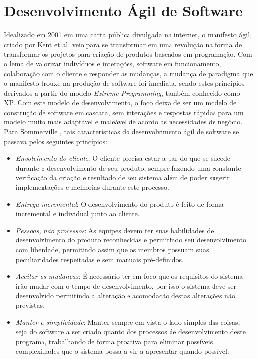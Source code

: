 \section{Desenvolvimento Ágil de Software}

Idealizado em 2001 em uma carta pública divulgada na internet, o manifesto ágil, criado por Kent et al. \cite{agilemanifesto} veio para se transformar em uma revolução na forma de transformar os projetos para criação de produtos baseados em programação. Com o lema de valorizar indivíduos e interações, software em funcionamento, colaboração com o cliente e responder as mudanças, a mudança de paradigma que o manifesto trouxe na produção de software foi imediata, sendo estes princípios derivados a partir do modelo \textit{Extreme Programming}, também conhecido como \acrshort{XP}. Com este modelo de desenvolvimento, o foco deixa de ser um modelo de construção de software em cascata, sem interações e respostas rápidas para um modelo muito mais adaptável e maleável de acordo as necessidades de negócio. Para Sommerville \cite{Sommerville07}, tais características do desenvolvimento ágil de software se passava pelos seguintes princípios:

\begin{itemize}
    \item \textit{Envolvimento do cliente}: O cliente precisa estar a par do que se sucede durante o desenvolvimento de seu produto, sempre fazendo uma constante verificação da criação e resultado de seu sistema além de poder sugerir implementações e melhorias durante este processo.
    
    \item \textit{Entrega incremental}: O desenvolvimento do produto é feito de forma incremental e individual junto ao cliente.
    
    \item \textit{Pessoas, não processos}: As equipes devem ter suas habilidades de desenvolvimento do produto reconhecidas e permitindo seu desenvolvimento com liberdade, permitindo assim que os membros possuam suas peculiaridades respeitadas e sem manuais pré-definidos.
    
    \item \textit{Aceitar as mudanças}: É necessário ter em foco que os requisitos do sistema irão mudar com o tempo de desenvolvimento, por isso o sistema deve ser desenvolvido permitindo a alteração e acomodação destas alterações não previstas.
    
    \item \textit{Manter a simplicidade}: Manter sempre em vista o lado simples das coisas, seja do software a ser criado quanto dos processos de desenvolvimento deste programa, trabalhando de forma proativa para eliminar possíveis complexidades que o sistema possa a vir a apresentar quando possível.

\end{itemize}

